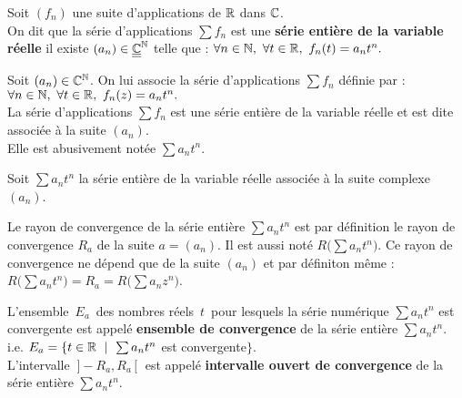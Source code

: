 \vspace{1.3cm}

Soit \((f_n)\) une suite d'applications de \(\mathbb{R}\) dans \(\mathbb{C}\).\vspace{0.1cm}\\
On dit que la série d'applications \(\sum f_n\) est une \textbf{série entière de la variable réelle} \ssi il existe \((a_n)\in \underline{\underline{\mathbb{C}}}^{\mathbb{N}}\) telle que : \(\forall n\in \NN,\ \forall t\in \RR,\ f_n(t)=a_nt^n.\)\vspace{0.3cm}\\
\begin{small}
    Soit \((a_n)\in \mathbb{C}^{\mathbb{N}}\). On lui associe la série d'applications \(\sum f_n\) définie par : \(\forall n \in \mathbb{N},\ \forall t\in \mathbb{R}, \ f_n(z)=a_nt^n.\)\\
     La série d'applications \(\sum f_n\) est une série entière de la variable réelle et est dite associée à la suite \((a_n)\). \\
     Elle est abusivement notée \(\sum a_nt^n\).    
\end{small}

\vspace{1.3cm}

Soit \(\sum a_nt^n\) la série entière de la variable réelle associée à la suite complexe \((a_n)\).\vspace{0.1cm}\\
\begin{small}
    Le rayon de convergence de la série entière \(\sum a_nt^n\) est par définition le rayon de convergence \(R_a\) de la suite \(a=(a_n)\). Il est aussi noté \(R\bigl(\sum a_nt^n\bigr)\). Ce rayon de convergence ne dépend que de la suite \((a_n)\) et par définiton même : \(R\bigl(\sum a_nt^n\bigr) = R_a = R\bigl(\sum a_nz^n\bigr)\).\vspace{0.2cm}\\
\end{small} 
L'ensemble \(\,E_a\,\) des nombres réels \(\,t\,\) pour lesquels la série numérique \(\sum a_nt^n\) est convergente est appelé \textbf{ensemble de convergence} de la série entière \(\sum a_nt^n\).\vspace{0.1cm}\\
i.e. \(E_a = \{ t\in \mathbb{R} \ \mid \ \sum a_nt^n\) est convergente$\}$.\vspace{0.2cm}\\
L'intervalle \(\:]-\!R_a,R_a\, [\;\) est appelé \textbf{intervalle ouvert de convergence} de la série entière \(\sum a_nt^n\).

